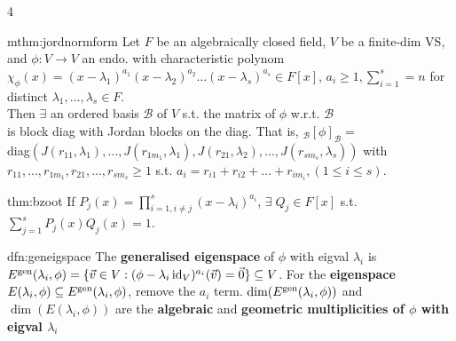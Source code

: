 \documentclass[landscape, 8pt]{extarticle}
\begin{document}
\begin{multicols*}{4}
		
		\begin{mthm}{mthm:jordnormform}{ }
			Let $F$ be an algebraically closed field, $V$ be a finite-dim VS, and $\phi : V \to V$ an endo. with characteristic polynom $\chi_\phi(x) = (x - \lambda_1)^{a_1}(x-\lambda_2)^{a_2}\dots(x-\lambda_s)^{a_s} \in F[x]$, $a_i \ge 1, \sum_{i=1}^{s} = n$ for distinct $\lambda_1, \dots, \lambda_s \in F$.\\
			Then $\exists$ an ordered basis $\mathcal{B}$ of $V$ s.t. the matrix of $\phi$ w.r.t. $\mathcal{B}$\\
			is block diag with Jordan blocks on the diag. That is,
			$_\mathcal{B}[\phi]_\mathcal{B} = $\\
			diag$(J(r_{11}, \lambda_1), \dots, J(r_{1m_1}, \lambda_1), J(r_{21}, \lambda_2), \dots, J(r_{sm_s}, \lambda_s))$ with $r_{11}, \dots, r_{1m_1}, r_{21}, \dots, r_{sm_s} \ge 1$ s.t. $a_i = r_{i1} + r_{i2} + \dots + r_{im_i}, (1 \le i \le s)$.
			
		\end{mthm}
		
		
		\begin{thm}{thm:bzoot}{ }
			If $P_j(x) = \prod_{i=1, i\ne j}^{s} (x-\lambda_i)^{a_i}$, $\exists \; Q_j\in F[x]$ s.t. $\sum_{j=1}^{s}P_j(x)Q_j(x) = 1$.
			
		\end{thm}
		
		
		\begin{dfn}{dfn:geneigspace}{ }
			The \textbf{generalised eigenspace} of $\phi$ with eigval $\lambda_i$ is $E^{\operatorname{gen}}(\lambda_i, \phi) = \{\vec{v}\in V : (\phi - \lambda_i \operatorname{id}_V)^{a_i}(\vec{v})=\vec{0}\} \subseteq V$. For the \textbf{eigenspace} $E(\lambda_i, \phi) \subseteq E^{\operatorname{gen}}(\lambda_i, \phi)$, remove the $a_i$ term. $\dim(E^{\operatorname{gen}}(\lambda_i, \phi))$ and $\dim (E(\lambda_i, \phi))$ are the \textbf{algebraic} and \textbf{geometric multiplicities of $\phi$ with eigval $\lambda_i$}
			
		\end{dfn}
		

\end{multicols*}
\end{document}
